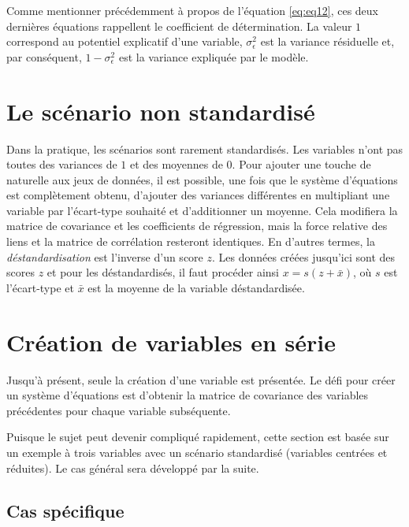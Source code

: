 \documentclass[
]{book}
\begin{document}
Comme mentionner précédemment à propos de l'équation \eqref{eq:eq12}, ces deux dernières équations rappellent le coefficient de détermination. La valeur \(1\) correspond au potentiel explicatif d'une variable, \(\sigma_\epsilon^2\) est la variance résiduelle et, par conséquent, \(1-\sigma_\epsilon^2\) est la variance expliquée par le modèle.

\hypertarget{le-scuxe9nario-non-standardisuxe9}{%
\section{Le scénario non standardisé}\label{le-scuxe9nario-non-standardisuxe9}}

Dans la pratique, les scénarios sont rarement standardisés. Les variables n'ont pas toutes des variances de \(1\) et des moyennes de \(0\). Pour ajouter une touche de naturelle aux jeux de données, il est possible, une fois que le système d'équations est complètement obtenu, d'ajouter des variances différentes en multipliant une variable par l'écart-type souhaité et d'additionner un moyenne. Cela modifiera la matrice de covariance et les coefficients de régression, mais la force relative des liens et la matrice de corrélation resteront identiques. En d'autres termes, la \emph{déstandardisation} est l'inverse d'un score \(z\). Les données créées jusqu'ici sont des scores \(z\) et pour les déstandardisés, il faut procéder ainsi \(x = s(z + \bar{x})\), où \(s\) est l'écart-type et \(\bar{x}\) est la moyenne de la variable déstandardisée.

\hypertarget{cruxe9ation-de-variables-en-suxe9rie}{%
\section{Création de variables en série}\label{cruxe9ation-de-variables-en-suxe9rie}}

Jusqu'à présent, seule la création d'une variable est présentée. Le défi pour créer un système d'équations est d'obtenir la matrice de covariance des variables précédentes pour chaque variable subséquente.

Puisque le sujet peut devenir compliqué rapidement, cette section est basée sur un exemple à trois variables avec un scénario standardisé (variables centrées et réduites). Le cas général sera développé par la suite.

\hypertarget{cas-spuxe9cifique}{%
\subsection{Cas spécifique}\label{cas-spuxe9cifique}}
\end{document}
